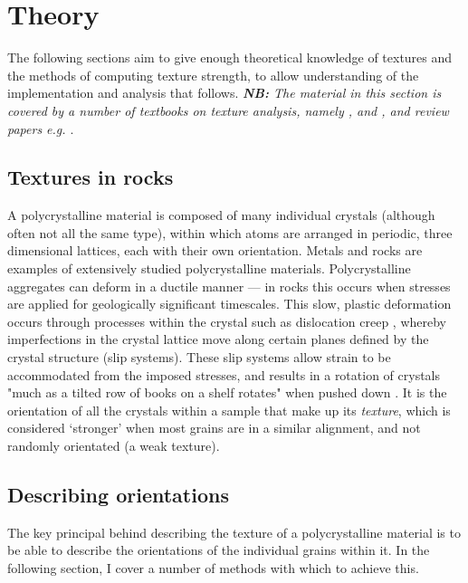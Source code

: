 \documentclass[a4paper,12pt,twoside]{report}
\numberwithin{equation}{chapter}
\begin{document}
\chapter{Theory} \label{chap:theory}
\vspace{-1cm}
The following sections aim to give enough theoretical knowledge of textures and the methods of computing texture strength, to allow understanding of the implementation and analysis that follows. \emph{\textbf{NB:} The material in this section is covered by a number of textbooks on texture analysis, namely \cite{bunge1982texture}, \cite{Bunge1985} and \cite{Randle2000}, and review papers e.g. \cite{Mainprice}}.


\section{Textures in rocks} 
A polycrystalline material is composed of many individual crystals (although often not all the same type), within which atoms are arranged in periodic, three dimensional lattices, each with their own orientation. Metals and rocks are examples of extensively studied polycrystalline materials. Polycrystalline aggregates can deform in a ductile manner --- in rocks this occurs when stresses are applied for geologically significant timescales. This slow, plastic deformation occurs through processes within the crystal such as dislocation creep \citep{Ashby1972},  whereby imperfections in the crystal lattice move along certain planes defined by the crystal structure (slip systems). These slip systems allow strain to be accommodated from the imposed stresses, and results in a rotation of crystals "much as a tilted row of books on a shelf rotates" when pushed down \citep{Goulding2015}. It is the orientation of all the crystals within a sample that make up its \emph{texture}, which is considered \lq{}stronger\rq{} when most grains are in a similar alignment, and not randomly orientated (a weak texture).       


\section{Describing orientations} \label{sec:orientations}
The key principal behind describing the texture of a polycrystalline material is to be able to describe the orientations of the individual grains within it. In the following section, I cover a number of methods with which to achieve this.
\end{document}
